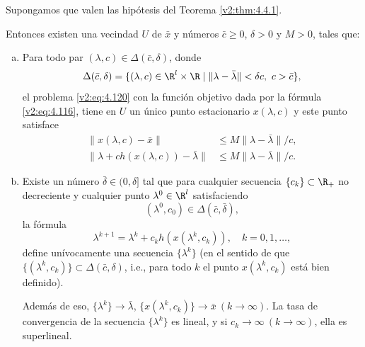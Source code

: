 \begin{theorem}\label{v2:thm:4.4.6}
    Supongamos que valen las hipótesis del Teorema \ref{v2:thm:4.4.1}.
    
    Entonces existen una vecindad $U$ de $\bar{x}$ y números $\bar{c} \ge 0$, $\delta > 0$ y $M > 0$, tales que:
    \begin{enumerate}[(a)]
        \item Para todo par $(\lambda, c) \in \Delta(\bar{c}, \delta)$, donde
        \[
            \Delta(\bar{c}, \delta) = \{ (\lambda, c) \in \R^l \times \R \mid \|\lambda - \bar{\lambda}\| < \delta c, \ c > \bar{c} \},
        \]
        el problema \eqref{v2:eq:4.120} con la función objetivo dada por la fórmula \eqref{v2:eq:4.116}, tiene en $U$ un único punto estacionario $x(\lambda, c)$ y este punto satisface
        \begin{align}
            \|x(\lambda, c) - \bar{x}\| &\le M \|\lambda - \bar{\lambda}\| / c, \nonumber \\
            \|\lambda + c h(x(\lambda, c)) - \bar{\lambda}\| &\le M \|\lambda - \bar{\lambda}\| / c. \label{v2:eq:4.121}
        \end{align}
        \item Existe un número $\bar{\delta} \in (0, \delta]$ tal que para cualquier secuencia $\{c_k\} \subset \R_+$ no decreciente y cualquier punto $\lambda^0 \in \R^l$ satisfaciendo
        \begin{equation}
            (\lambda^0, c_0) \in \Delta(\bar{c}, \bar{\delta}),
            \label{v2:eq:4.122}
        \end{equation}
        la fórmula
        \[
            \lambda^{k+1} = \lambda^k + c_k h(x(\lambda^k, c_k)), \quad k = 0, 1, \dots,
        \]
        define unívocamente una secuencia $\{\lambda^k\}$ (en el sentido de que $\{(\lambda^k, c_k)\} \subset \Delta(\bar{c}, \delta)$, i.e., para todo $k$ el punto $x(\lambda^k, c_k)$ está bien definido).
        
        Además de eso, $\{\lambda^k\} \to \bar{\lambda}$, $\{x(\lambda^k, c_k)\} \to \bar{x} \ (k \to \infty)$. La tasa de convergencia de la secuencia $\{\lambda^k\}$ es lineal, y si $c_k \to \infty \ (k \to \infty)$, ella es superlineal.
    \end{enumerate}
\end{theorem}

